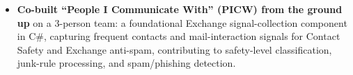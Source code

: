 \documentclass{resume-v2}
\begin{document}
\begin{itemize}
  \item \textbf{Co-built ``People I Communicate With'' (PICW) from the ground up} on a 3-person team: a foundational Exchange signal-collection component in C\#, capturing frequent contacts and mail-interaction signals for Contact Safety and Exchange anti\mbox{-}spam, contributing to safety-level classification, junk-rule processing, and spam/phishing detection.

\end{itemize}
\end{document}
